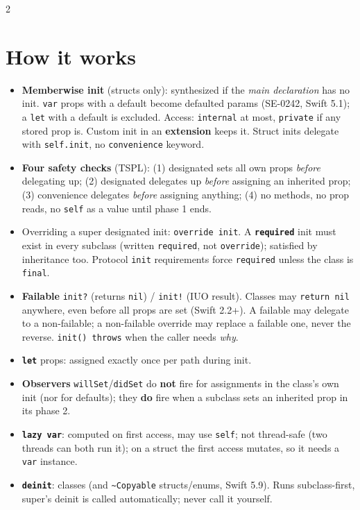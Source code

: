 \documentclass[8pt]{extarticle}
\begin{document}
\begin{multicols}{2}
\raggedright

\section{How it works}
\begin{itemize}
  \item \textbf{Memberwise init} (structs only): synthesized if the \emph{main declaration}
        has no init. \texttt{var} props with a default become defaulted params (SE-0242,
        Swift 5.1); a \texttt{let} with a default is excluded. Access: \texttt{internal}
        at most, \texttt{private} if any stored prop is. Custom init in an
        \textbf{extension} keeps it. Struct inits delegate with \texttt{self.init}, no
        \texttt{convenience} keyword.
  \item \textbf{Four safety checks} (TSPL): (1) designated sets all own props
        \emph{before} delegating up; (2) designated delegates up \emph{before}
        assigning an inherited prop; (3) convenience delegates \emph{before} assigning
        anything; (4) no methods, no prop reads, no \texttt{self} as a value until phase 1 ends.
  \item Overriding a super designated init: \texttt{override init}. A \textbf{\texttt{required}}
        init must exist in every subclass (written \texttt{required}, not \texttt{override});
        satisfied by inheritance too. Protocol \texttt{init} requirements force
        \texttt{required} unless the class is \texttt{final}.
  \item \textbf{Failable} \texttt{init?} (returns \texttt{nil}) / \texttt{init!} (IUO result).
        Classes may \texttt{return nil} anywhere, even before all props are set (Swift 2.2+).
        A failable may delegate to a non-failable; a non-failable override may replace a
        failable one, never the reverse. \texttt{init() throws} when the caller needs \emph{why}.
  \item \textbf{\texttt{let}} props: assigned exactly once per path during init.
  \item \textbf{Observers} \texttt{willSet}/\texttt{didSet} do \textbf{not} fire for assignments in
        the class's own init (nor for defaults); they \textbf{do} fire when a subclass sets
        an inherited prop in its phase 2.
  \item \textbf{\texttt{lazy var}}: computed on first access, may use \texttt{self}; not
        thread-safe (two threads can both run it); on a struct the first access mutates, so
        it needs a \texttt{var} instance.
  \item \textbf{\texttt{deinit}}: classes (and \texttt{\textasciitilde Copyable} structs/enums, Swift 5.9).
        Runs subclass-first, super's deinit is called automatically; never call it yourself.
\end{itemize}


\end{multicols}
\end{document}
